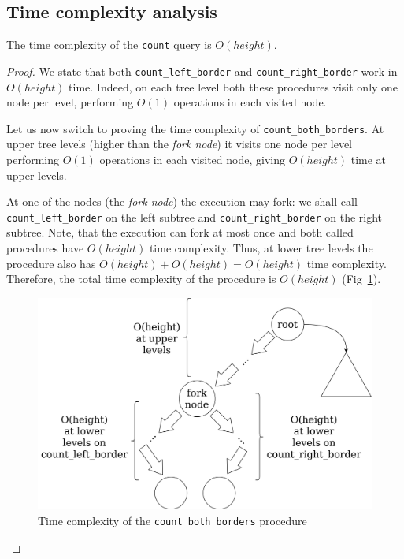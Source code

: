 \documentclass[times, dvipsnames,%
               languages={russian,english} %
              ]{itmo-student-thesis}
\begin{document}
\subsection{Time complexity analysis}

\begin{theorem}
The time complexity of the \texttt{count} query is $O(height)$.
\end{theorem}
\begin{proof}
We state that both \texttt{count\_left\_border} and \texttt{count\_right\_border} work in $O(height)$ time. Indeed, on each tree level both these procedures visit only one node per level, performing $O(1)$ operations in each visited node.

Let us now switch to proving the time complexity of \texttt{count\_both\_borders}. At upper tree levels (higher than the \emph{fork node}) it visits one node per level performing $O(1)$ operations in each visited node, giving $O(height)$ time at upper levels. 

At one of the nodes (the \emph{fork node}) the execution may fork: we shall call \texttt{count\_left\_border} on the left subtree and \texttt{count\_right\_border} on the right subtree. Note, that the execution can fork at most once and both called procedures have $O(height)$ time complexity. Thus, at lower tree levels the procedure also has $O(height) + O(height) = O(height)$ time complexity. Therefore, the total time complexity of the procedure is $O(height)$ (Fig~\ref{sequential-time-png}).

\begin{figure}[H]
  \centering
  \caption{Time complexity of the \texttt{count\_both\_borders} procedure}
  \label{sequential-time-png}
  \includegraphics[width=\linewidth]{pics/sequential-time.png}
\end{figure}
\end{proof}
\end{document}
